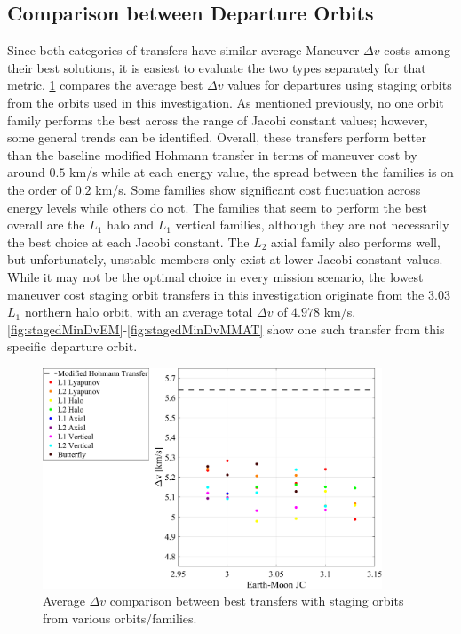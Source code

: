 \subsection{Comparison between Departure Orbits}
Since both categories of transfers have similar average Maneuver $\Delta v$ costs among their best
solutions, it is easiest to evaluate the two types separately for that metric.
\cref{fig:compareDeltavStaged} compares the average best $\Delta v$ values for departures using
staging orbits from the orbits used in this investigation. As mentioned previously, no one orbit
family performs the best across the range of Jacobi constant values; however, some general trends
can be identified. Overall, these transfers perform better than the baseline modified Hohmann
transfer in terms of maneuver cost by around $0.5$ km/s while at each energy value, the spread
between the families is on the order of $0.2$ km/s. Some families show significant cost fluctuation
across energy levels while others do not. The families that seem to perform the best overall are
the $L_{1}$ halo and $L_{1}$ vertical families, although they are not necessarily the best choice
at each Jacobi constant. The $L_{2}$ axial family also performs well, but unfortunately, unstable
members only exist at lower Jacobi constant values. While it may not be the optimal choice in every
mission scenario, the lowest maneuver cost staging orbit transfers in this investigation originate
from the $3.03$ $L_{1}$ northern halo orbit, with an average total $\Delta v$ of $4.978$ km/s.
\cref{fig:stagedMinDvEM}-\cref{fig:stagedMinDvMMAT} show one such transfer from this specific
departure orbit.

\begin{figure}[!htb]
    \centering
    \includegraphics[width=0.9\textwidth]{figures/DeltavComparisonStaged.pdf}
    \caption{Average $\Delta v$ comparison between best transfers with staging orbits from various orbits/families.}
    \label{fig:compareDeltavStaged}
\end{figure}


